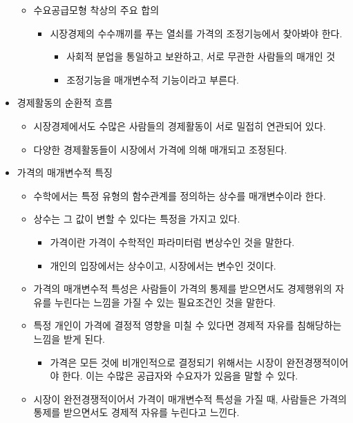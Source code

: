 \documentclass{report}
\begin{document}
\begin{itemize}
\begin{itemize}
        \item 수요공급모형 착상의 주요 합의
        \begin{itemize}
            \item 시장경제의 수수깨끼를 푸는 열쇠를 가격의 조정기능에서 찾아봐야 한다.
            \begin{itemize}
                \item 사회적 분업을 통일하고 보완하고, 서로 무관한 사람들의 매개인 것
                \item 조정기능을 매개변수적 기능이라고 부른다.
            \end{itemize}
        \end{itemize}
    \end{itemize}
    \item 경제활동의 순환적 흐름
    \begin{itemize}
        \item 시장경제에서도 수많은 사람들의 경제활동이 서로 밀접히 연관되어 있다.
        \item 다양한 경제활동들이 시장에서 가격에 의해 매개되고 조정된다.
    \end{itemize}
    \item 가격의 매개변수적 특징
    \begin{itemize}
        \item 수학에서는 특정 유형의 함수관계를 정의하는 상수를 매개변수이라 한다.
        \item 상수는 그 값이 변할 수 있다는 특정을 가지고 있다.
        \begin{itemize}
            \item 가격이란 가격이 수학적인 파라미터럼 변상수인 것을 말한다.
            \item 개인의 입장에서는 상수이고, 시장에서는 변수인 것이다.
        \end{itemize}
        \item 가격의 매개변수적 특성은 사람들이 가격의 통제를 받으면서도 경제행위의 자유를 누린다는 느낌을 가질 수 있는 필요조건인 것을 말한다.
        \item 특정 개인이 가격에 결정적 영향을 미칠 수 있다면 경제적 자유를 침해당하는 느낌을 받게 된다.
        \begin{itemize}
            \item 가격은 모든 것에 비개인적으로 결정되기 위해서는 시장이 완전경쟁적이어야 한다. 이는 수많은 공급자와 수요자가 있음을 말할 수 있다.
        \end{itemize}
        \item 시장이 완전경쟁적이어서 가격이 매개변수적 특성을 가질 때, 사람들은 가격의 통제를 받으면서도 경제적 자유를 누린다고 느낀다.

\end{itemize}
\end{itemize}
\end{document}
